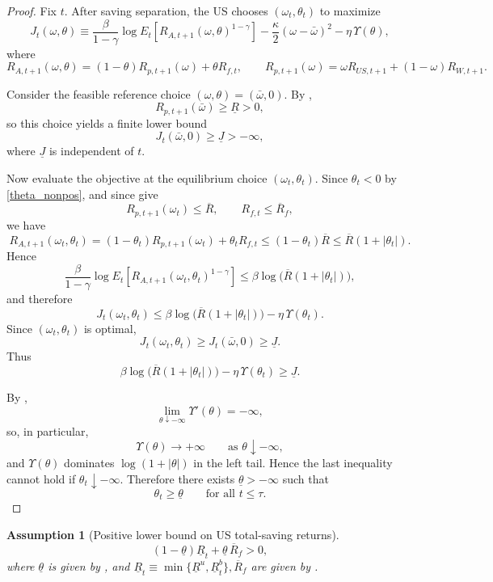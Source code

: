 \documentclass[12pt]{article}
\theoremstyle{plain}
\newtheorem{ass}{Assumption}
\begin{document}
\begin{proof}
Fix $t$. After saving separation, the US chooses $(\omega_t,\theta_t)$ to maximize
\[
J_t(\omega,\theta)
\equiv
\frac{\beta}{1-\gamma}\log E_t\!\left[R_{A,t+1}(\omega,\theta)^{1-\gamma}\right]
-\frac{\kappa}{2}(\omega-\bar\omega)^2
-\eta\,\Upsilon(\theta),
\]
where
\[
R_{A,t+1}(\omega,\theta)
=
(1-\theta)R_{p,t+1}(\omega)+\theta R_{f,t},
\qquad
R_{p,t+1}(\omega)=\omega R_{US,t+1}+(1-\omega)R_{W,t+1}.
\]

Consider the feasible reference choice $(\omega,\theta)=(\bar\omega,0)$. By ,
\[
R_{p,t+1}(\bar\omega) \ge \underline R >0,
\]
so this choice yields a finite lower bound
\[
J_t(\bar\omega,0)\ge \underline J>-\infty,
\]
where $\underline J$ is independent of $t$.

Now evaluate the objective at the equilibrium choice $(\omega_t,\theta_t)$. Since $\theta_t<0$ by
\eqref{theta_nonpos}, and since  give
\[
R_{p,t+1}(\omega_t)\le \overline R,
\qquad
R_{f,t}\le \overline R_f,
\]
we have
\[
R_{A,t+1}(\omega_t,\theta_t)
=
(1-\theta_t)R_{p,t+1}(\omega_t)+\theta_t R_{f,t}
\le
(1-\theta_t)\overline R
\le
\overline R(1+|\theta_t|).
\]
Hence
\[
\frac{\beta}{1-\gamma}\log E_t\!\left[R_{A,t+1}(\omega_t,\theta_t)^{1-\gamma}\right]
\le
\beta\log\!\bigl(\overline R(1+|\theta_t|)\bigr),
\]
and therefore
\[
J_t(\omega_t,\theta_t)
\le
\beta\log\!\bigl(\overline R(1+|\theta_t|)\bigr)-\eta\,\Upsilon(\theta_t).
\]
Since $(\omega_t,\theta_t)$ is optimal,
\[
J_t(\omega_t,\theta_t)\ge J_t(\bar\omega,0)\ge \underline J.
\]
Thus
\[
\beta\log\!\bigl(\overline R(1+|\theta_t|)\bigr)-\eta\,\Upsilon(\theta_t)\ge \underline J.
\]

By ,
\[
\lim_{\theta\downarrow -\infty}\Upsilon'(\theta)=-\infty,
\]
so, in particular,
\[
\Upsilon(\theta)\to+\infty
\qquad\text{as }\theta\downarrow -\infty,
\]
and $\Upsilon(\theta)$ dominates $\log(1+|\theta|)$ in the left tail. Hence the last inequality cannot hold if
$\theta_t\downarrow -\infty$. Therefore there exists $\underline\theta>-\infty$ such that
\[
\theta_t\ge \underline\theta
\qquad\text{for all }t\le\tau.
\]
\end{proof}


\begin{ass}[Positive lower bound on US total-saving returns]\label{ass_positive_total_saving_return}
\[
(1-\underline\theta)\underline R_t+\underline\theta\,\overline R_f>0,
\]
where $\underline\theta$ is given by , and
$\underline R_t\equiv \min\{\underline R^u, \underline R^b_t\},\overline R_f$ are given by .
\end{ass}
\end{document}
